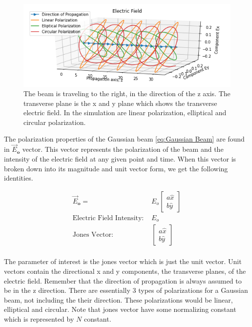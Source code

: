 \documentclass[11pt,a4paper]{book}
\begin{document}
		\begin{figure} 
			\centering
			\includegraphics[scale=0.8]{images/chapter-3/Polarization_of_Electromagnetic_Radiation.png}
			\caption{The beam is traveling to the right, in the direction of the z axis. The transverse plane is the x and y plane which shows the transverse electric field. In the simulation are linear polarization, elliptical and circular polarization.}
			\label{fig:Polarization_of_Electromagnetic_Radiation.png}	
		\end{figure}
		
		The polarization properties of the Gaussian beam \autoref{eq:Gaussian Beam} are found in $\vec{E}_\textbf{o}$ vector. This vector represents the polarization of the beam and the intensity of the electric field at any given point and time. When this vector is broken down into its magnitude and unit vector form, we get the following identities.
		
		\begin{equation}
		\begin{split}
		\vec{E}_\textbf{o}  =& E_{o}			
		\left[\begin{matrix}
		a\hat{x}\\ b\hat{y}
		\end{matrix}\right]\\
		\text{Electric Field Intensity: }& E_{o} \\
		\text{Jones Vector: } &
		\left[\begin{matrix}
		a\hat{x}\\ b\hat{y}
		\end{matrix}\right]\\
		\end{split}
		\end{equation}
		
		\noindent The parameter of interest is the jones vector which is just the unit vector. Unit vectors contain the directional x and y components, the transverse planes, of the electric field. Remember that the direction of propagation is always assumed to be in the z direction. There are essentially 3 types of polarizations for a Gaussian beam, not including the their direction. These polarizations would be linear, elliptical and circular. Note that jones vector have some normalizing constant which is represented by $N$ constant.
		
\end{document}

